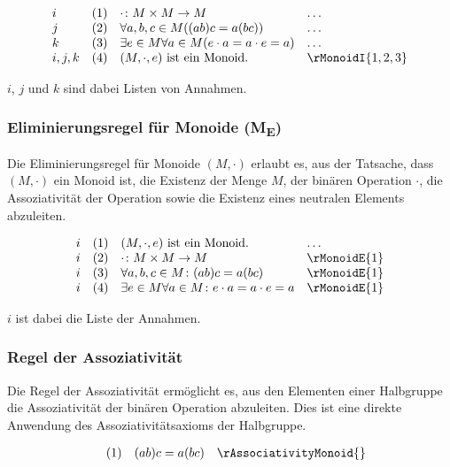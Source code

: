 \documentclass{book}
\theoremstyle{plain}
\theoremstyle{remark}
\theoremstyle{definition}
\begin{document}
\[
\begin{array}{llll}
    i       & (1) & \cdot \colon M \times M \to M & \dots \\
    j       & (2) & \forall a, b, c \in M ((ab)c = a(bc)) & \dots \\
    k       & (3) & \exists e \in M \forall a \in M(e \cdot a = a \cdot e = a) & \dots \\
    i,j,k   & (4) & (M, \cdot, e) \text{ ist ein Monoid.} & \rMonoidI{1,2,3}
\end{array}
\]

\(i\), \(j\) und \(k\) sind dabei Listen von Annahmen.

\subsubsection*{Eliminierungsregel für Monoide (M\textsubscript{E})}
\label{rule:rMonoidE}
Die Eliminierungsregel für Monoide \((M, \cdot)\) erlaubt es, aus der Tatsache, dass \((M, \cdot)\) ein Monoid ist, die Existenz der Menge \(M\), der binären Operation \(\cdot\), die Assoziativität der Operation sowie die Existenz eines neutralen Elements abzuleiten.

\[
\begin{array}{llll}
    i       & (1) & (M, \cdot, e) \text{ ist ein Monoid.} & \dots \\
    i       & (2) & \cdot \colon M \times M \to M & \rMonoidE{1} \\
    i       & (3) & \forall a, b, c \in M \colon (ab)c = a(bc) & \rMonoidE{1} \\
    i       & (4) & \exists e \in M \forall a \in M \colon e \cdot a = a \cdot e = a & \rMonoidE{1}
\end{array}
\]

\(i\) ist dabei die Liste der Annahmen.

\subsubsection*{Regel der Assoziativität}
\label{rule:rAssociativityMonoid}
Die Regel der Assoziativität ermöglicht es, aus den Elementen einer Halbgruppe die Assoziativität der binären Operation abzuleiten. Dies ist eine direkte Anwendung des Assoziativitätsaxioms der Halbgruppe.

\[
\begin{array}{llll}
         & (1) & (ab)c = a(bc) & \rAssociativityMonoid{}
\end{array}
\]
\end{document}
